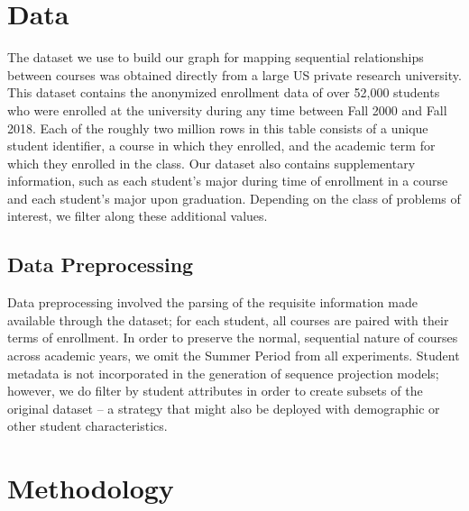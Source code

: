 \documentclass{sigchi}
\begin{document}
\section{Data}
\label{sec:data}
The dataset we use to build our graph for mapping sequential
relationships between courses was obtained directly from a large US private research university. This dataset contains the anonymized enrollment data of over 52,000 students who were enrolled at the university during any time
between Fall 2000 and Fall 2018. Each of the roughly two million rows
in this table consists of  a unique student identifier,  a course in
which they enrolled, and the academic term for which they enrolled in the class. Our dataset also contains supplementary information, such as each student's major during time of enrollment in a course and each student's major upon graduation. Depending on the class of problems of interest, we filter along these additional values.

\subsection{Data Preprocessing}
\label{sec:data_processing}

Data preprocessing involved the parsing of the requisite information made available through the dataset; for each student, all courses are paired with their terms of enrollment. In order to preserve the normal, sequential nature of courses across academic years, we omit the Summer Period from all experiments. Student metadata is not incorporated in the generation of sequence projection models; however, we do filter by student attributes in order to create subsets of the original dataset -- a strategy that might also be deployed with demographic or other student characteristics.

\section{Methodology}
\label{sec:methodology}
\end{document}
